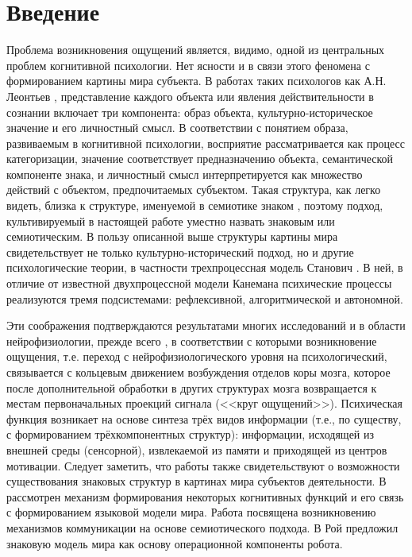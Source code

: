 \documentclass[12pt]{scrartcl}
\begin{document}
	\section*{Введение}
	Проблема возникновения ощущений является, видимо, одной из центральных проблем когнитивной психологии. Нет ясности и в связи этого феномена с формированием картины мира субъекта. В работах таких психологов как А.Н. Леонтьев \cite{Leontiev1977}, представление каждого объекта или явления действительности в сознании включает три компонента: образ объекта, культурно-историческое значение и его личностный смысл. В соответствии с понятием образа, развиваемым в когнитивной психологии, восприятие рассматривается как процесс категоризации, значение соответствует предназначению объекта, семантической компоненте знака, и личностный смысл интерпретируется как множество действий с объектом, предпочитаемых субъектом. Такая структура, как легко видеть, близка к структуре, именуемой в семиотике знаком \cite{Pierce2000b,Frege2000}, поэтому подход, культивируемый в настоящей работе уместно назвать знаковым или семиотическим. В пользу описанной выше структуры картины мира свидетельствует не только культурно-исторический подход, но и другие психологические теории, в частности трехпроцессная модель Станович \cite{Stanovich2009}. В ней, в отличие от известной двухпроцессной модели Канемана \cite{Kahneman2011} психические процессы реализуются тремя подсистемами: рефлексивной, алгоритмической и автономной.
	
	Эти соображения подтверждаются результатами многих исследований и в области нейрофизиологии, прежде всего \cite{Ivanitsky1996}, в соответствии с которыми возникновение ощущения, т.е. переход с нейрофизиологического уровня на психологический, связывается с кольцевым движением возбуждения отделов коры мозга, которое после дополнительной обработки в других структурах мозга возвращается к местам первоначальных проекций сигнала (<<круг ощущений>>). Психическая функция \cite{Ivanitsky2010} возникает на основе синтеза трёх видов информации (т.е., по существу, с формированием трёхкомпонентных структур): информации, исходящей из внешней среды (сенсорной), извлекаемой из памяти и приходящей из центров мотивации. Следует заметить, что работы \cite{Edelmen1981,Edelman1987} также свидетельствуют о возможности существования знаковых структур в картинах мира субъектов деятельности. В \cite{Friederici2015} рассмотрен механизм формирования некоторых когнитивных функций и его связь с формированием языковой модели мира. Работа \cite{Loula2012} посвящена возникновению механизмов коммуникации на основе семиотического подхода. В \cite{Roy2005} Рой предложил знаковую модель мира как основу операционной компоненты робота. 
	
\end{document}
